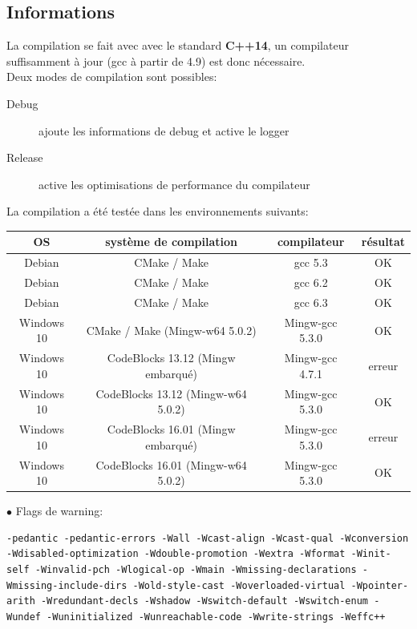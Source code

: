 \documentclass[article, backcover, french, nodocumentinfo]{upmethodology-document}
\begin{document}
		\subsection{Informations}
				La compilation se fait avec avec le standard \textbf{C++14}, un compilateur suffisamment à jour (gcc à partir de 4.9) est donc nécessaire.\\
				Deux modes de compilation sont possibles:
				\begin{description}
					\item[Debug] ajoute les informations de debug et active le logger
					\item[Release] active les optimisations de performance du compilateur
				\end{description}
				La compilation a été testée dans les environnements suivants:
				\begin{center}
					\begin{tabular}{|c|c|c|c|}
						\hline
						OS & système de compilation & compilateur & résultat\\
						\hline
						Debian & CMake / Make & gcc 5.3 & OK\cellcolor{green}\\
						\hline
						Debian & CMake / Make & gcc 6.2 & OK\cellcolor{green}\\
						\hline
						Debian & CMake / Make & gcc 6.3 & OK\cellcolor{green}\\
						\hline
						Windows 10 & CMake / Make (Mingw-w64 5.0.2) & Mingw-gcc 5.3.0 & OK\cellcolor{green}\\
						\hline
						Windows 10 & CodeBlocks 13.12 (Mingw embarqué) & Mingw-gcc 4.7.1 & erreur\cellcolor{red}\\
						\hline
						Windows 10 & CodeBlocks 13.12 (Mingw-w64 5.0.2) & Mingw-gcc 5.3.0 & OK\cellcolor{green}\\
						\hline
						Windows 10 & CodeBlocks 16.01 (Mingw embarqué) & Mingw-gcc 5.3.0 & erreur\cellcolor{red}\\
						\hline
						Windows 10 & CodeBlocks 16.01 (Mingw-w64 5.0.2) & Mingw-gcc 5.3.0 & OK\cellcolor{green}\\
						\hline
					\end{tabular}
				\end{center}
				$\bullet$ Flags de warning:
				\begin{lstlisting}[breaklines=true,breakatwhitespace=true,breakindent=0pt,columns=fixed,keepspaces=true,frame=single,basicstyle=\footnotesize\sffamily]
-pedantic -pedantic-errors -Wall -Wcast-align -Wcast-qual -Wconversion -Wdisabled-optimization -Wdouble-promotion -Wextra -Wformat -Winit-self -Winvalid-pch -Wlogical-op -Wmain -Wmissing-declarations -Wmissing-include-dirs -Wold-style-cast -Woverloaded-virtual -Wpointer-arith -Wredundant-decls -Wshadow -Wswitch-default -Wswitch-enum -Wundef -Wuninitialized -Wunreachable-code -Wwrite-strings -Weffc++\end{lstlisting}
\end{document}
